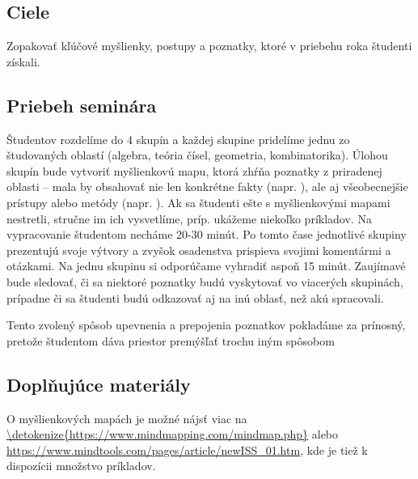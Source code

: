 
\subsection*{Ciele}

Zopakovať kľúčové myšlienky, postupy a poznatky, ktoré v priebehu roka študenti získali.

\subsection*{Priebeh seminára}


Študentov rozdelíme do 4 skupín a každej skupine pridelíme jednu zo študovaných oblastí (algebra, teória čísel, geometria, kombinatorika). Úlohou skupín bude vytvoriť myšlienkovú mapu, ktorá zhŕňa poznatky z priradenej oblasti -- mala by obsahovať nie len konkrétne fakty (napr. ), ale aj všeobecnejšie prístupy alebo metódy (napr. ).  Ak sa študenti ešte s myšlienkovými mapami nestretli, stručne im ich vysvetlíme, príp. ukážeme niekoľko príkladov. Na vypracovanie študentom necháme 20-30 minút. Po tomto čase jednotlivé skupiny prezentujú svoje výtvory a zvyšok osadenstva prispieva svojimi komentármi a otázkami. Na jednu skupinu si odporúčame vyhradiť aspoň 15 minút. Zaujímavé bude sledovať, či sa niektoré poznatky budú vyskytovať vo viacerých skupinách, prípadne či sa študenti budú odkazovať aj na inú oblasť, než akú spracovali.

Tento zvolený spôsob upevnenia a prepojenia poznatkov pokladáme za prínosný, pretože študentom dáva priestor premýšľať trochu iným spôsobom


\subsection*{Doplňujúce materiály}

O myšlienkových mapách je možné nájsť viac na \url{\detokenize{https://www.mindmapping.com/mindmap.php}} alebo \url{https://www.mindtools.com/pages/article/newISS_01.htm}, kde je tiež k dispozícii množstvo príkladov.



